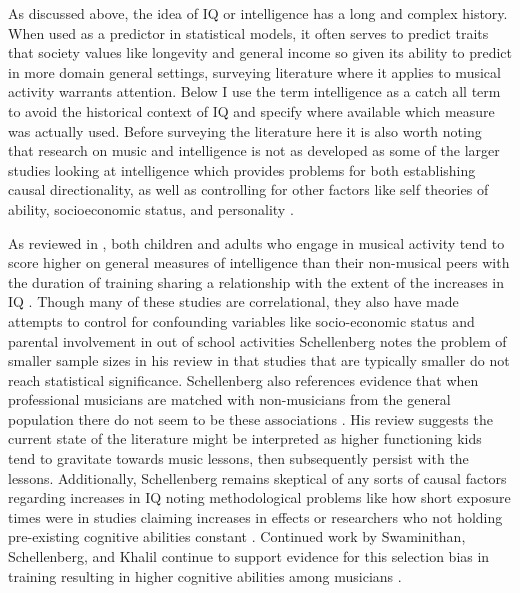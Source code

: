 \documentclass[]{book}
\begin{document}
As discussed above, the idea of IQ or intelligence has a long and complex history.
When used as a predictor in statistical models, it often serves to predict traits that society values like longevity and general income so given its ability to predict in more domain general settings, surveying literature where it applies to musical activity warrants attention.
Below I use the term intelligence as a catch all term to avoid the historical context of IQ and specify where available which measure was actually used.
Before surveying the literature here it is also worth noting that research on music and intelligence is not as developed as some of the larger studies looking at intelligence which provides problems for both establishing causal directionality, as well as controlling for other factors like self theories of ability, socioeconomic status, and personality \citep{mullensiefenInvestigatingImportanceSelftheories2015}.

As reviewed in \citet{schellenbergMusicNonmusicalAbilities2017}, both children and adults who engage in musical activity tend to score higher on general measures of intelligence than their non-musical peers \citep{gibsonEnhancedDivergentThinking2009, hilleAssociationsMusicEducation2011, schellenbergExaminingAssociationMusic2011, schellenbergMusicTrainingEmotion2012} with the duration of training sharing a relationship with the extent of the increases in IQ \citep{corrigallPredictingWhoTakes2015, degeMusicLessonsIntelligence2011, schellenbergLongtermPositiveAssociations2006}.
Though many of these studies are correlational, they also have made attempts to control for confounding variables like socio-economic status and parental involvement in out of school activities \citep{corrigallAssociationsLengthMusic2011, degeMusicLessonsIntelligence2011, schellenbergExaminingAssociationMusic2011, schellenbergMusicTrainingEmotion2012}
Schellenberg notes the problem of smaller sample sizes in his review \citep{corrigallAssociationsLengthMusic2011, parbery-clarkMusicalExperienceAging2011, straitMusicalTrainingEarly2012} in that studies that are typically smaller do not reach statistical significance.
Schellenberg also references evidence that when professional musicians are matched with non-musicians from the general population there do not seem to be these associations \citep{schellenbergLongtermPositiveAssociations2006}.
His review suggests the current state of the literature might be interpreted as higher functioning kids tend to gravitate towards music lessons, then subsequently persist with the lessons.
Additionally, Schellenberg remains skeptical of any sorts of causal factors regarding increases in IQ \citep{francoisMusicTrainingDevelopment2013, morenoMusicalTrainingInfluences2009} noting methodological problems like how short exposure times were in studies claiming increases in effects or researchers who not holding pre-existing cognitive abilities constant \citep{mehrTwoRandomizedTrials2013}.
Continued work by Swaminithan, Schellenberg, and Khalil continue to support evidence for this selection bias in training resulting in higher cognitive abilities among musicians \citep{swaminathanRevisitingAssociationMusic2017}.
\end{document}
